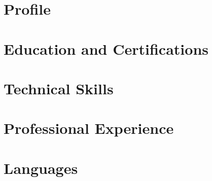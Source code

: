 \documentclass[10pt,a4paper,english]{article}
\begin{document}






\section*{Profile}





\section*{Education and Certifications}





\section*{Technical Skills}





\section*{Professional Experience}





\section*{Languages}

\end{document}
